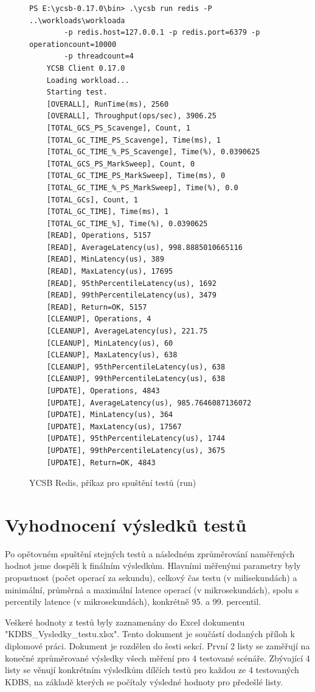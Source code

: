 \documentclass[czech,master,dept460,male,csharp,cpdeclaration]{diploma}
\begin{document}
	\begin{figure}
	\centering
	\begin{lstlisting}[style=DOS]
	PS E:\ycsb-0.17.0\bin> .\ycsb run redis -P ..\workloads\workloada
		-p redis.host=127.0.0.1 -p redis.port=6379 -p operationcount=10000
		-p threadcount=4
	YCSB Client 0.17.0
	Loading workload...
	Starting test.
	[OVERALL], RunTime(ms), 2560
	[OVERALL], Throughput(ops/sec), 3906.25
	[TOTAL_GCS_PS_Scavenge], Count, 1
	[TOTAL_GC_TIME_PS_Scavenge], Time(ms), 1
	[TOTAL_GC_TIME_%_PS_Scavenge], Time(%), 0.0390625
	[TOTAL_GCS_PS_MarkSweep], Count, 0
	[TOTAL_GC_TIME_PS_MarkSweep], Time(ms), 0
	[TOTAL_GC_TIME_%_PS_MarkSweep], Time(%), 0.0
	[TOTAL_GCs], Count, 1
	[TOTAL_GC_TIME], Time(ms), 1
	[TOTAL_GC_TIME_%], Time(%), 0.0390625
	[READ], Operations, 5157
	[READ], AverageLatency(us), 998.8885010665116
	[READ], MinLatency(us), 389
	[READ], MaxLatency(us), 17695
	[READ], 95thPercentileLatency(us), 1692
	[READ], 99thPercentileLatency(us), 3479
	[READ], Return=OK, 5157
	[CLEANUP], Operations, 4
	[CLEANUP], AverageLatency(us), 221.75
	[CLEANUP], MinLatency(us), 60
	[CLEANUP], MaxLatency(us), 638
	[CLEANUP], 95thPercentileLatency(us), 638
	[CLEANUP], 99thPercentileLatency(us), 638
	[UPDATE], Operations, 4843
	[UPDATE], AverageLatency(us), 985.7646087136072
	[UPDATE], MinLatency(us), 364
	[UPDATE], MaxLatency(us), 17567
	[UPDATE], 95thPercentileLatency(us), 1744
	[UPDATE], 99thPercentileLatency(us), 3675
	[UPDATE], Return=OK, 4843
	\end{lstlisting}
	\caption{YCSB Redis, příkaz pro spuštění testů (run)
	\label{ps-ycsb-run}}
	\end{figure}

	\section{Vyhodnocení výsledků testů}
	
	Po opětovném spuštění stejných testů a následném zprůměrování naměřených hodnot jsme dospěli k finálním výsledkům. Hlavními měřenými parametry byly propustnost (počet operací za sekundu), celkový čas testu (v milisekundách) a minimální, průměrná a maximální latence operací (v mikrosekundách), spolu s percentily latence (v mikrosekundách), konkrétně 95. a 99. percentil.
	
	Veškeré hodnoty z testů byly zaznamenány do Excel dokumentu~\cite{excel} "KDBS\_Vysledky\_testu.xlsx". Tento dokument je součástí dodaných příloh k diplomové práci. Dokument je rozdělen do šesti sekcí. První 2 listy se zaměřují na konečné zprůměrované výsledky všech měření pro 4 testované scénáře. Zbývající 4 listy se věnují konkrétním výsledkům dílčích testů pro každou ze 4 testovaných KDBS, na základě kterých se počítaly výsledné hodnoty pro předešlé listy.
	
\end{document}
